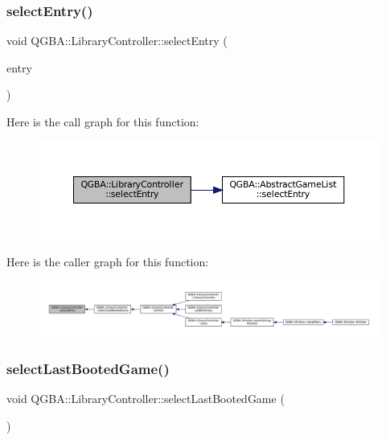 \subsubsection{\texorpdfstring{select\+Entry()}{selectEntry()}}
{\footnotesize\ttfamily void Q\+G\+B\+A\+::\+Library\+Controller\+::select\+Entry (\begin{DoxyParamCaption}\item[{\mbox{\hyperlink{namespace_q_g_b_a_a201fa9f2cb8f778666a134ba81909358}{Library\+Entry\+Ref}}}]{entry }\end{DoxyParamCaption})}

Here is the call graph for this function\+:
\nopagebreak
\begin{figure}[H]
\begin{center}
\leavevmode
\includegraphics[width=350pt]{class_q_g_b_a_1_1_library_controller_ac226d6690f902db907fbd66c80c45582_cgraph}
\end{center}
\end{figure}
Here is the caller graph for this function\+:
\nopagebreak
\begin{figure}[H]
\begin{center}
\leavevmode
\includegraphics[width=350pt]{class_q_g_b_a_1_1_library_controller_ac226d6690f902db907fbd66c80c45582_icgraph}
\end{center}
\end{figure}
\mbox{\label{class_q_g_b_a_1_1_library_controller_a31c1c6683f5f348b623da642dbd1f5e1}} 
\subsubsection{\texorpdfstring{select\+Last\+Booted\+Game()}{selectLastBootedGame()}}
{\footnotesize\ttfamily void Q\+G\+B\+A\+::\+Library\+Controller\+::select\+Last\+Booted\+Game (\begin{DoxyParamCaption}{ }\end{DoxyParamCaption})}

